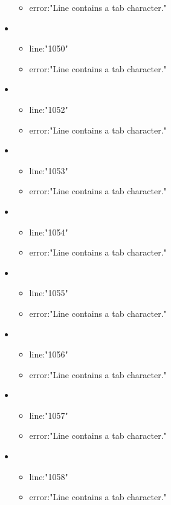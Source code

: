 \begin{itemize}
\begin{itemize}
		\item error:"Line contains a tab character." 
	\end{itemize}
	\item 
	\begin{itemize} 
		\item line:"1050" 
		\item error:"Line contains a tab character." 
	\end{itemize}
	\item 
	\begin{itemize} 
		\item line:"1052" 
		\item error:"Line contains a tab character." 
	\end{itemize}
	\item 
	\begin{itemize} 
		\item line:"1053" 
		\item error:"Line contains a tab character." 
	\end{itemize}
	\item 
	\begin{itemize} 
		\item line:"1054" 
		\item error:"Line contains a tab character." 
	\end{itemize}
	\item 
	\begin{itemize} 
		\item line:"1055" 
		\item error:"Line contains a tab character." 
	\end{itemize}
	\item 
	\begin{itemize} 
		\item line:"1056" 
		\item error:"Line contains a tab character." 
	\end{itemize}
	\item 
	\begin{itemize} 
		\item line:"1057" 
		\item error:"Line contains a tab character." 
	\end{itemize}
	\item 
	\begin{itemize} 
		\item line:"1058" 
		\item error:"Line contains a tab character." 
	\end{itemize}

\end{itemize}
